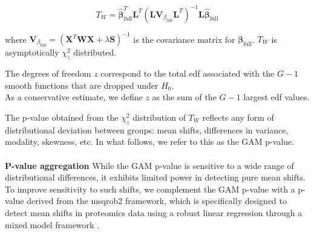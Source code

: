 \begin{equation}
    T_{W} = \hat{\boldsymbol{\beta}}_{\text{full}}^T\boldsymbol{L}^T(\boldsymbol{L}\boldsymbol{V}_{\beta_{\text{full}}} \boldsymbol{L}^T)^{-1} \boldsymbol{L}\hat{\boldsymbol{\beta}}_{\text{full}}
    \label{eq:wald_difftest}
\end{equation}

where $\boldsymbol{V}_{\beta_{\text{full}}} = (\boldsymbol{X}^T\boldsymbol{W}\boldsymbol{X} + \lambda \boldsymbol{S})^{-1}$ is the covariance matrix for $\boldsymbol{\beta}_{\text{full}}$. $T_W$ is asymptotically $\chi^2_z$ distributed.

The degrees of freedom $z$ correspond to the total edf associated with the $G-1$ smooth functions that are dropped under $H_0$.\\
As a conservative estimate, we define $z$ as the sum of the $G-1$ largest edf values.

The p-value obtained from the $\chi^2_z$ distribution of $T_W$ reflects any form of distributional deviation between groups: mean shifts, differences in variance, modality, skewness, etc. In what follows, we refer to this as the GAM p-value.
\\
\\
\textbf{P-value aggregation}
While the GAM p-value is sensitive to a wide range of distributional differences, it exhibits limited power in detecting pure mean shifts. To improve sensitivity to such shifts, we complement the GAM p-value with a p-value derived from the msqrob2 framework, which is specifically designed to detect mean shifts in proteomics data using a robust linear regression through a mixed model framework \cite{msqrob}.

